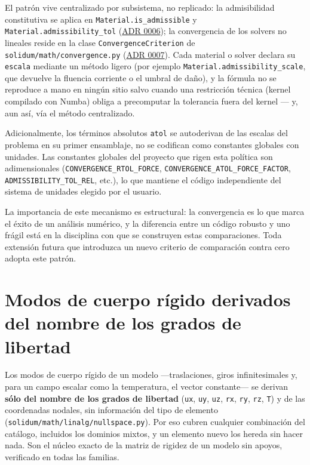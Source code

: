 \documentclass[11pt,oneside]{report}
\begin{document}
El patrón vive centralizado por subsistema, no replicado: la admisibilidad constitutiva se aplica en \texttt{Material.\allowbreak{}is\_\allowbreak{}admissible} y \texttt{Material.\allowbreak{}admissibility\_\allowbreak{}tol} (\hyperref[adr:0006]{ADR 0006}); la convergencia de los solvers no lineales reside en la clase \texttt{ConvergenceCriterion} de \texttt{solidum/\allowbreak{}math/\allowbreak{}convergence.\allowbreak{}py} (\hyperref[adr:0007]{ADR 0007}). Cada material o solver declara su \texttt{escala} mediante un método ligero (por ejemplo \texttt{Material.\allowbreak{}admissibility\_\allowbreak{}scale}, que devuelve la fluencia corriente o el umbral de daño), y la fórmula no se reproduce a mano en ningún sitio salvo cuando una restricción técnica (kernel compilado con Numba) obliga a precomputar la tolerancia fuera del kernel --- y, aun así, vía el método centralizado.

Adicionalmente, los términos absolutos \texttt{atol} se autoderivan de las escalas del problema en su primer ensamblaje, no se codifican como constantes globales con unidades. Las constantes globales del proyecto que rigen esta política son adimensionales (\texttt{CONVERGENCE\_\allowbreak{}RTOL\_\allowbreak{}FORCE}, \texttt{CONVERGENCE\_\allowbreak{}ATOL\_\allowbreak{}FORCE\_\allowbreak{}FACTOR}, \texttt{ADMISSIBILITY\_\allowbreak{}TOL\_\allowbreak{}REL}, etc.), lo que mantiene el código independiente del sistema de unidades elegido por el usuario.

La importancia de este mecanismo es estructural: la convergencia es lo que marca el éxito de un análisis numérico, y la diferencia entre un código robusto y uno frágil está en la disciplina con que se construyen estas comparaciones. Toda extensión futura que introduzca un nuevo criterio de comparación contra cero adopta este patrón.

\section{Modos de cuerpo rígido derivados del nombre de los grados de libertad}

Los modos de cuerpo rígido de un modelo ---traslaciones, giros infinitesimales y, para un campo escalar como la temperatura, el vector constante--- se derivan \textbf{sólo del nombre de los grados de libertad} (\texttt{ux}, \texttt{uy}, \texttt{uz}, \texttt{rx}, \texttt{ry}, \texttt{rz}, \texttt{T}) y de las coordenadas nodales, sin información del tipo de elemento (\texttt{solidum/\allowbreak{}math/\allowbreak{}linalg/\allowbreak{}nullspace.\allowbreak{}py}). Por eso cubren cualquier combinación del catálogo, incluidos los dominios mixtos, y un elemento nuevo los hereda sin hacer nada. Son el núcleo exacto de la matriz de rigidez de un modelo sin apoyos, verificado en todas las familias.
\end{document}
